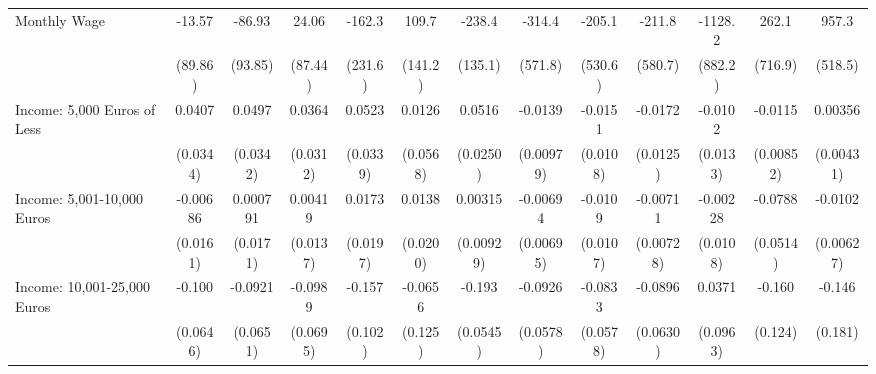 {\begin{tabular}{l*{12}{c}}
\addlinespace
Monthly Wage&      -13.57         &      -86.93         &       24.06         &      -162.3         &       109.7         &      -238.4         &      -314.4         &      -205.1         &      -211.8         &     -1128.2         &       262.1         &       957.3         \\
            &     (89.86)         &     (93.85)         &     (87.44)         &     (231.6)         &     (141.2)         &     (135.1)         &     (571.8)         &     (530.6)         &     (580.7)         &     (882.2)         &     (716.9)         &     (518.5)         \\
\addlinespace
Income: 5,000 Euros of Less&      0.0407         &      0.0497         &      0.0364         &      0.0523         &      0.0126         &      0.0516\sym{*}  &     -0.0139         &     -0.0151         &     -0.0172         &     -0.0102         &     -0.0115         &     0.00356         \\
            &    (0.0344)         &    (0.0342)         &    (0.0312)         &    (0.0339)         &    (0.0568)         &    (0.0250)         &   (0.00979)         &    (0.0108)         &    (0.0125)         &    (0.0133)         &   (0.00852)         &   (0.00431)         \\
\addlinespace
Income: 5,001-10,000 Euros&    -0.00686         &    0.000791         &     0.00419         &      0.0173         &      0.0138         &     0.00315         &    -0.00694         &     -0.0109         &    -0.00711         &    -0.00228         &     -0.0788         &     -0.0102         \\
            &    (0.0161)         &    (0.0171)         &    (0.0137)         &    (0.0197)         &    (0.0200)         &   (0.00929)         &   (0.00695)         &    (0.0107)         &   (0.00728)         &    (0.0108)         &    (0.0514)         &   (0.00627)         \\
\addlinespace
Income: 10,001-25,000 Euros&      -0.100         &     -0.0921         &     -0.0989         &      -0.157         &     -0.0656         &      -0.193\sym{***}&     -0.0926         &     -0.0833         &     -0.0896         &      0.0371         &      -0.160         &      -0.146         \\
            &    (0.0646)         &    (0.0651)         &    (0.0695)         &     (0.102)         &     (0.125)         &    (0.0545)         &    (0.0578)         &    (0.0578)         &    (0.0630)         &    (0.0963)         &     (0.124)         &     (0.181)         \\

\end{tabular}}
